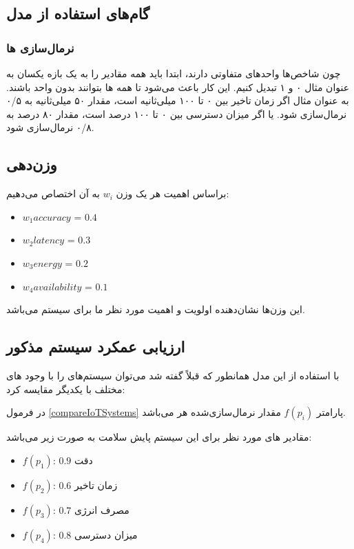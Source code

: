 \subsection*{گام‌های استفاده از مدل}

\subsubsection*{نرمال‌سازی ها}

چون شاخص‌ها واحد‌های متفاوتی دارند، ابتدا باید همه مقادیر را به یک بازه یکسان به
عنوان مثال ۰ و ۱ تبدیل کنیم. این کار باعث می‌شود تا همه ها بتوانند بدون
واحد باشند. به عنوان مثال اگر زمان تاخیر بین ۰ تا ۱۰۰ میلی‌ثانیه است، مقدار ۵۰
میلی‌ثانیه به ۰/۵ نرمال‌سازی شود. یا اگر میزان دسترسی بین ۰ تا ۱۰۰ درصد است،
مقدار ۸۰ درصد به ۰/۸ نرمال‌سازی شود.

\subsection*{وزن‌دهی}

براساس اهمیت هر  یک وزن $w_i$ به آن اختصاص می‌دهیم:

\begin{LTR}
    \begin{itemize}
        \item $w_1{accuracy}$ = $0.4$
        \item $w_2{latency}$ = $0.3$
        \item $w_3{energy}$ = $0.2$
        \item $w_4{availability}$ = $0.1$
    \end{itemize}
\end{LTR}

این وزن‌ها نشان‌دهنده اولویت و اهمیت  مورد نظر ما برای سیستم 
می‌باشد.

\subsection*{ارزیابی عمکرد سیستم مذکور}

با استفاده از این مدل همانطور که قبلاً گفته شد می‌توان سیستم‌های  را با
وجود های مختلف با یکدیگر مقایسه کرد:

در فرمول \ref{compareIoTSystems} پارامتر $f(p_i)$ مقدار نرمال‌سازی‌شده هر
 می‌باشد.

مقادیر های مورد نظر برای این سیستم پایش سلامت به صورت زیر می‌باشد: 

\begin{itemize}
    \item $f(p_1)$: $0.9$ دقت
    \item $f(p_2)$: $0.6$ زمان تاخیر
    \item $f(p_3)$: $0.7$ مصرف انرژی
    \item $f(p_4)$: $0.8$ میزان دسترسی
\end{itemize}

